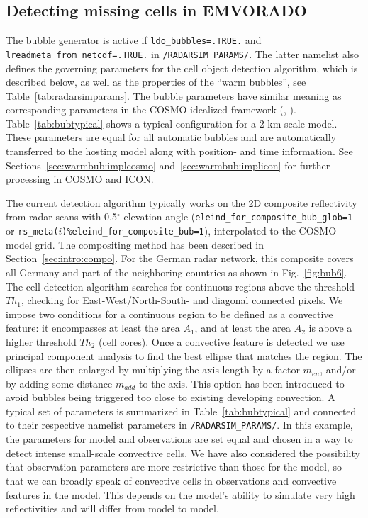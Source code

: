 \documentclass[10pt,a4paper,twoside,headinclude,footinclude,parskip=half]{scrartcl}
\newcommand{\myaktuellesection}{sec:intro}%
\newcommand{\labelsec}[1]{\label{#1}\renewcommand{\myaktuellesection}{#1}}%
\newcommand{\labelsec}[1]{\label{#1}}%
\newcommand{\grad}{\ensuremath{^{\circ}}\xspace}
\newcommand{\citeNPK}[1]{\citeauthor{#1}, \citeyear{#1}}
\newcommand{\srcform}[1]{\mbox{\texttt{#1}}\xspace}%
\begin{document}
\subsection{Detecting missing cells in EMVORADO}

\labelsec{sec:warmbub:impl}

The bubble generator is active if \srcform{ldo_bubbles=.TRUE.} and \srcform{lreadmeta_from_netcdf=.TRUE.} in \srcform{/RADARSIM_PARAMS/}.
The latter namelist also defines the governing parameters for the cell object detection algorithm, which is described below,
as well as the properties of the ``warm bubbles'', see Table~\ref{tab:radarsimparams}.
The bubble parameters have similar meaning as corresponding parameters
in the COSMO idealized framework (\citeNPK{blahak2015b}).
Table~\ref{tab:bubtypical} shows a typical configuration for a 2-km-scale model.
These parameters are equal for all automatic bubbles and are automatically transferred to the hosting model along
with position- and time information.
See Sections~\ref{sec:warmbub:implcosmo} and~\ref{sec:warmbub:implicon} for further processing in COSMO and ICON.

The current detection algorithm typically works on the 2D composite reflectivity from radar scans with 0.5\grad elevation angle
(\srcform{eleind_for_composite_bub_glob=1} or \srcform{rs_meta($i$)\%eleind_for_composite_bub=1}),
interpolated to the COSMO-model grid. The compositing method has been described in Section~\ref{sec:intro:compo}.
For the German radar network, this composite covers all Germany and part of the neighboring countries as
shown in Fig.~\ref{fig:bub6}. The cell-detection algorithm searches for continuous regions above the
threshold $Th_1$, checking for East-West/North-South- and diagonal connected pixels.
We impose two conditions for a continuous region to be defined as a convective feature:
it encompasses at least the area $A_1$, and at least the area $A_2$ is above a higher threshold $Th_2$ (cell cores).
Once a convective feature is detected we use principal component analysis to find the best
ellipse that matches the region. The ellipses are then enlarged by multiplying the axis length by a factor $m_{en}$,
and/or by adding some distance $m_{add}$ to the axis. This option has been introduced to avoid bubbles being
triggered too close to existing developing convection. A typical set of parameters is summarized in Table~\ref{tab:bubtypical}
and connected to their respective namelist parameters in \srcform{/RADARSIM_PARAMS/}.
In this example, the parameters for model and observations are set equal and chosen in a way to detect intense
small-scale convective cells. We have also considered the possibility that observation parameters
are more restrictive than those for the model, so that we can broadly speak of convective cells in
observations and convective features in the model. This depends on the model's ability to simulate
very high reflectivities and will differ from model to model.
\end{document}

